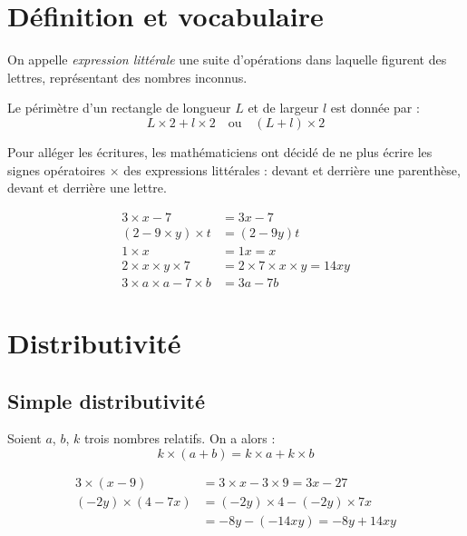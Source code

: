 \documentclass[11pt]{article}
\begin{document}
\section{Définition et vocabulaire}

\begin{definition}
On appelle \emph{expression littérale} une suite d'opérations dans laquelle
figurent des lettres, représentant des nombres inconnus.
\end{definition}

\begin{exemple}
Le périmètre d'un rectangle de longueur $L$ et de largeur $l$ est
donnée par :
\[ L \times 2 + l \times 2 \quad \text{ou} \quad (L + l) \times 2 \]
\end{exemple}

\begin{remarque}
Pour alléger les écritures, les mathématiciens ont décidé de ne plus
écrire les signes opératoires $\times$ des expressions littérales : devant
et derrière une parenthèse, devant et derrière une lettre.
\end{remarque}

\begin{exemple}
\begin{align*}
3 \times x - 7 &= 3x - 7 \\
(2 - 9 \times y) \times t &= (2 - 9y)t \\
1 \times x &= 1x = x \\
2 \times x \times y \times 7 &= 2 \times 7 \times x \times y = 14xy \\
3 \times a \times a - 7 \times b &= 3a - 7b
\end{align*}
\end{exemple}

\section{Distributivité}
\subsection{Simple distributivité}

\begin{propriete}
Soient $a$, $b$, $k$ trois nombres relatifs. On a alors :
\[ k \times (a + b) = k \times a + k \times b \]
\end{propriete}

\begin{exemple}
\begin{align*}
3 \times (x - 9) &= 3 \times x - 3 \times 9 = 3x - 27 \\
(-2y) \times (4 - 7x) &= (-2y) \times 4 - (-2y) \times 7x \\
&= -8y - (-14xy) = -8y + 14xy
\end{align*}
\end{exemple}
\end{document}

